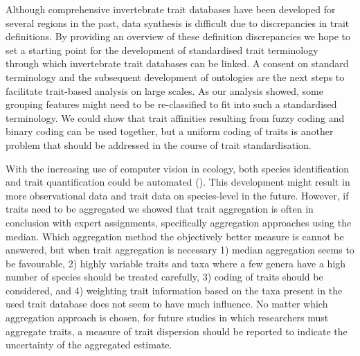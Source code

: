 \documentclass{article}
\begin{document}
Although comprehensive invertebrate trait databases have been developed for several regions in the past, data synthesis is difficult due to discrepancies in trait definitions. By providing an overview of these definition discrepancies we hope to set a starting point for the development of standardised trait terminology through which invertebrate trait databases can be linked. A consent on standard terminology and the subsequent development of ontologies are the next steps to facilitate trait-based analysis on large scales. As our analysis showed, some grouping features might need to be re-classified to fit into such a standardised terminology. We could show that trait affinities resulting from fuzzy coding and binary coding can be used together, but a uniform coding of traits is another problem that should be addressed in the course of trait standardisation.  

With the increasing use of computer vision in ecology, both species identification and trait quantification could be automated (\cite{milosevic_application_2020, hoye_deep_2020}). This development might result in more observational data and trait data on species-level in the future. However, if traits need to be aggregated we showed that trait aggregation is often in conclusion with expert assignments, specifically aggregation approaches using the median. Which aggregation method the objectively better measure is cannot be answered, but when trait aggregation is necessary 1) median aggregation seems to be favourable, 2) highly variable traits and taxa where a few genera have a high number of species should be treated carefully, 3) coding of traits should be considered, and 4) weighting trait information based on the taxa present in the used trait database does not seem to have much influence. No matter which aggregation approach is chosen, for future studies in which researchers must aggregate traits, a measure of trait dispersion should be reported to indicate the uncertainty of the aggregated estimate. 
\end{document}
